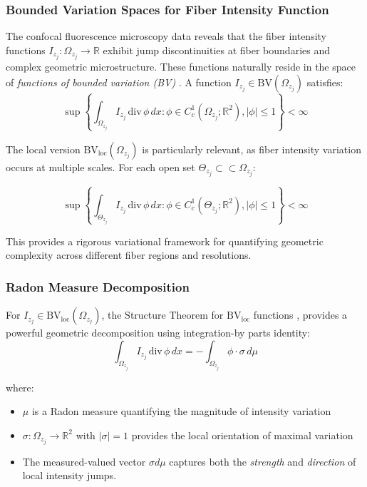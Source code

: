 \documentclass[11pt]{article}
\begin{document}
\subsubsection{Bounded Variation Spaces for Fiber Intensity Function}

The confocal fluorescence microscopy data reveals that the fiber intensity functions $I_{z_j} : \Omega_{z_j}\rightarrow \mathbb{R}$ exhibit jump discontinuities at fiber boundaries and complex geometric microstructure. These functions naturally reside in the space of \textit{functions of bounded variation (BV)} \cite{EvansGariepy2015}. A function $I_{z_j} \in \text{BV}(\Omega_{z_j})$ satisfies:
\[
\sup \left\{\int_{\Omega_{z_j}}I_{z_j}\, \text{div}\,\phi\,dx : \phi\in C_c^1(\Omega_{z_j}; \mathbb{R}^2), |\phi| \leq 1 \right\} < \infty
\]

The local version $\text{BV}_{\text{loc}}(\Omega_{z_j})$ is particularly relevant, as fiber intensity variation occurs at multiple scales. For each open set $\Theta_{z_j}\subset\subset\Omega_{z_j}$:

\[
\sup \left\{\int_{\Theta_{z_j}}I_{z_j}\, \text{div}\,\phi\,dx : \phi\in C_c^1(\Theta_{z_j}; \mathbb{R}^2), |\phi| \leq 1 \right\} < \infty
\]

This provides a rigorous variational framework for quantifying geometric complexity across different fiber regions and resolutions. 

\subsubsection{Radon Measure Decomposition}
For $I_{z_j} \in \text{BV}_{\text{loc}}(\Omega_{z_j})$, the Structure Theorem for $\text{BV}_{\text{loc}}$ functions \cite[Theorem 5.1]{EvansGariepy2015}, provides a powerful geometric decomposition using integration-by parts identity:
\[
\int_{\Omega_{z_{j}}} I_{z_j}\,\text{div}\,\phi\,dx = -\int_{\Omega_{z_{j}}} \phi \cdot\sigma\,d\mu
\]

where:
\begin{itemize}
    \item $\mu$ is a Radon measure quantifying the magnitude of intensity variation
    \item $\sigma : \Omega_{z_j}\rightarrow \mathbb{R}^2$ with $|\sigma|=1$ provides the local orientation of maximal variation
    \item The measured-valued vector $\sigma d\mu$ captures both the \textit{strength} and \textit{direction} of local intensity jumps.
\end{itemize}
\end{document}
